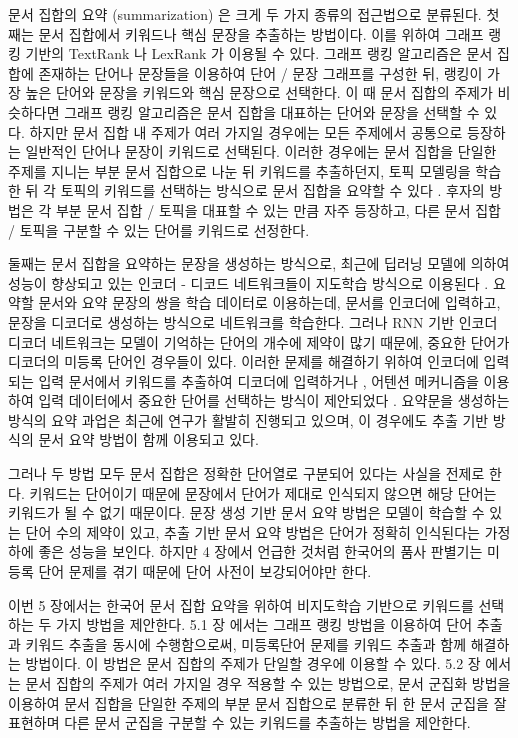 \documentclass[11pt]{article}
\begin{document}
문서 집합의 요약 (summarization) 은 크게 두 가지 종류의 접근법으로 분류된다.
첫째는 문서 집합에서 키워드나 핵심 문장을 추출하는 방법이다.
이를 위하여 그래프 랭킹 기반의 TextRank \citep{mihalcea2004textrank} 나 LexRank \citep{erkan2004lexrank} 가 이용될 수 있다.
그래프 랭킹 알고리즘은 문서 집합에 존재하는 단어나 문장들을 이용하여 단어 / 문장 그래프를 구성한 뒤, 랭킹이 가장 높은 단어와 문장을 키워드와 핵심 문장으로 선택한다.
이 때 문서 집합의 주제가 비슷하다면 그래프 랭킹 알고리즘은 문서 집합을 대표하는 단어와 문장을 선택할 수 있다.
하지만 문서 집합 내 주제가 여러 가지일 경우에는 모든 주제에서 공통으로 등장하는 일반적인 단어나 문장이 키워드로 선택된다.
이러한 경우에는 문서 집합을 단일한 주제를 지니는 부분 문서 집합으로 나눈 뒤 키워드를 추출하던지, 토픽 모델링을 학습한 뒤 각 토픽의 키워드를 선택하는 방식으로 문서 집합을 요약할 수 있다 \citep{chuang2012termite, sievert2014ldavis}.
후자의 방법은 각 부분 문서 집합 / 토픽을 대표할 수 있는 만큼 자주 등장하고, 다른 문서 집합 / 토픽을 구분할 수 있는 단어를 키워드로 선정한다.

둘째는 문서 집합을 요약하는 문장을 생성하는 방식으로, 최근에 딥러닝 모델에 의하여 성능이 향상되고 있는 인코더 - 디코드 네트워크들이 지도학습 방식으로 이용된다 \citep{rush2015neural}.
요약할 문서와 요약 문장의 쌍을 학습 데이터로 이용하는데, 문서를 인코더에 입력하고, 문장을 디코더로 생성하는 방식으로 네트워크를 학습한다.
그러나 RNN 기반 인코더 디코더 네트워크는 모델이 기억하는 단어의 개수에 제약이 많기 때문에, 중요한 단어가 디코더의 미등록 단어인 경우들이 있다.
이러한 문제를 해결하기 위하여 인코더에 입력되는 입력 문서에서 키워드를 추출하여 디코더에 입력하거나 \citep{nallapati2016abstractive}, 어텐션 메커니즘을 이용하여 입력 데이터에서 중요한 단어를 선택하는 방식이 제안되었다 \citep{see2017get, gu2016incorporating}.
요약문을 생성하는 방식의 요약 과업은 최근에 연구가 활발히 진행되고 있으며, 이 경우에도 추출 기반 방식의 문서 요약 방법이 함께 이용되고 있다.

그러나 두 방법 모두 문서 집합은 정확한 단어열로 구분되어 있다는 사실을 전제로 한다.
키워드는 단어이기 때문에 문장에서 단어가 제대로 인식되지 않으면 해당 단어는 키워드가 될 수 없기 때문이다.
문장 생성 기반 문서 요약 방법은 모델이 학습할 수 있는 단어 수의 제약이 있고, 추출 기반 문서 요약 방법은 단어가 정확히 인식된다는 가정 하에 좋은 성능을 보인다.
하지만 4 장에서 언급한 것처럼 한국어의 품사 판별기는 미등록 단어 문제를 겪기 때문에 단어 사전이 보강되어야만 한다.

이번 5 장에서는 한국어 문서 집합 요약을 위하여 비지도학습 기반으로 키워드를 선택하는 두 가지 방법을 제안한다.
5.1 장 에서는 그래프 랭킹 방법을 이용하여 단어 추출과 키워드 추출을 동시에 수행함으로써, 미등록단어 문제를 키워드 추출과 함께 해결하는 방법이다.
이 방법은 문서 집합의 주제가 단일할 경우에 이용할 수 있다.
5.2 장 에서는 문서 집합의 주제가 여러 가지일 경우 적용할 수 있는 방법으로, 문서 군집화 방법을 이용하여 문서 집합을 단일한 주제의 부분 문서 집합으로 분류한 뒤 한 문서 군집을 잘 표현하며 다른 문서 군집을 구분할 수 있는 키워드를 추출하는 방법을 제안한다.
\end{document}
